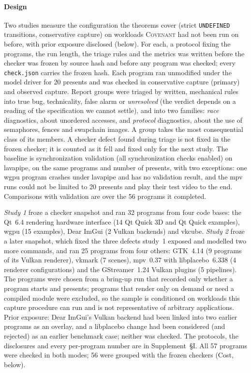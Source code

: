 \documentclass[acmtog,anonymous,review]{acmart}
\newcommand{\sys}{\textsc{Covenant}\xspace}
\newcommand{\code}[1]{\texttt{#1}}
\newcommand{\supp}[1]{Supplement~\S#1}
\begin{document}
\paragraph{Design}
Two studies measure the configuration the theorems cover (strict \code{UNDEFINED} transitions, conservative capture)
on workloads \sys had not been run on before, with prior exposure disclosed (below). For each, a protocol fixing the programs, the run length, the triage rules
and the metrics was written before the checker was frozen by source hash and before any program was checked; every
\code{check.json} carries the frozen hash. Each program ran unmodified under the model driver for 20 presents and was
checked in conservative capture (primary) and observed capture. Report groups were triaged by written, mechanical
rules into true bug, technicality, false alarm or \emph{unresolved} (the verdict depends on a reading of the
specification we cannot settle), and into two families: \emph{race} diagnostics, about unordered accesses, and
\emph{protocol} diagnostics, about the use of semaphores, fences and swapchain images. A group takes the most
consequential class of its members. A checker defect found during triage is not fixed in the frozen checker; it is
counted as it fell and fixed only for the next study. The baseline is synchronization validation
(all synchronization checks enabled) on lavapipe, on the same programs and number of presents, with two exceptions:
one wgpu program crashes under lavapipe and has no validation result, and the mpv runs could not be limited to 20
presents and play their test video to the end. Comparisons with validation are over the 56 programs it completed.

\emph{Study 1} froze a checker snapshot and ran 32 programs from four code bases: the Qt~6.4 rendering hardware interface (14 Qt Quick
3D and Qt Quick examples), wgpu (15 examples), Dear ImGui (2 Vulkan backends) and vkcube. \emph{Study 2} froze a
later snapshot, which fixed the three defects study~1 exposed and modelled two more commands, and ran 25 programs
from four others: GTK~4.14 (9 programs of its Vulkan renderer), vkmark (7 scenes), mpv~0.37 with libplacebo~6.338
(4 renderer configurations) and the GStreamer~1.24 Vulkan plugins (5 pipelines). The programs were chosen from a
bring-up run that recorded only whether a program starts and presents; programs that render only on demand or need a
compiled module were excluded, so the sample is conditioned on workloads this capture procedure can run and is not
representative of arbitrary applications. Prior exposure: Dear ImGui's Vulkan backend had been linked into two
earlier programs as an overlay, and a libplacebo change had been considered (and rejected) as an earlier benchmark
case; neither was checked. The protocols, the disclosures and every per-program number are in \supp{I}. All 57
programs were checked in both modes; 56 were grouped with the frozen checkers (Cost, below).
\end{document}
